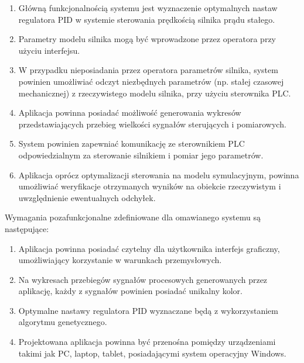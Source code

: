 \begin{enumerate}
\item Główną funkcjonalnością systemu jest wyznaczenie optymalnych nastaw regulatora PID w systemie sterowania prędkością silnika prądu stałego.
\item Parametry modelu silnika mogą być wprowadzone przez operatora przy użyciu interfejsu.
\item W przypadku nieposiadania przez operatora parametrów silnika, system powinien umożliwiać odczyt niezbędnych parametrów (np. stałej czasowej mechanicznej) z rzeczywistego modelu silnika, przy użyciu sterownika PLC.
\item Aplikacja powinna posiadać możliwość generowania wykresów przedstawiających przebieg wielkości sygnałów sterujących i pomiarowych.
\item System powinien zapewniać komunikację ze sterownikiem PLC odpowiedzialnym za sterowanie silnikiem i pomiar jego parametrów.
\item Aplikacja oprócz optymalizacji sterowania na modelu symulacyjnym, powinna umożliwiać weryfikacje otrzymanych wyników na obiekcie rzeczywistym i uwzględnienie ewentualnych odchyłek.
\end{enumerate}
\vspace{0.4cm}
\indent Wymagania pozafunkcjonalne zdefiniowane dla omawianego systemu są następujące:
\begin{enumerate}
\item Aplikacja powinna posiadać czytelny dla użytkownika interfejs graficzny, umożliwiający korzystanie w warunkach przemysłowych.
\item Na wykresach przebiegów sygnałów procesowych generowanych przez aplikację, każdy z sygnałów powinien posiadać unikalny kolor.
\item Optymalne nastawy regulatora PID wyznaczane będą z wykorzystaniem algorytmu genetycznego.
\item Projektowana aplikacja powinna być przenośna pomiędzy urządzeniami takimi jak PC, laptop, tablet, posiadającymi system operacyjny Windows.
\end{enumerate}

